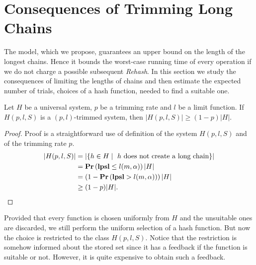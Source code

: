 \documentclass[runningheads,a4paper]{llncs}
\begin{document}
\section{Consequences of Trimming Long Chains}
The model, which we propose, guarantees an upper bound on the length of the longest chains. Hence it bounds the worst-case running time of every operation if we do not charge a possible subsequent \emph{Rehash}. In this section we study the consequences of limiting the lengths of chains and then estimate the expected number of trials, choices of a hash function, needed to find a suitable one. 

\begin{lemma}
\label{lemma-size-of-trimmed-system}
Let $H$ be a universal system, $p$ be a trimming rate and $l$ be a limit function. If $H(p, l, S)$ is a $(p, l)$-trimmed system, then $|H(p, l, S)| \geq (1 - p)|H|$.
\end{lemma}
\begin{proof}
Proof is a straightforward use of definition of the system $H(p, l, S)$ and of the trimming rate $p$.
\[
\begin{split}
|H(p, l, S)| 
	& = |\lbrace h \in H \mid \text{ $h$ does not create a long chain} \rbrace| \\
	& =\mathbf{Pr}\left(\mathbf{lpsl} \leq l(m, \alpha)\right) |H| \\
	& = \left(1 - \mathbf{Pr}\left(\mathbf{lpsl} > l(m, \alpha)\right)\right) |H| \\
	& \geq (1 - p)|H| \text{.}
\end{split}
\]
\end{proof}

Provided that every function is chosen uniformly from $H$ and the unsuitable ones are discarded, we still perform the uniform selection of a hash function. But now the choice is restricted to the class $H(p, l, S)$. Notice that the restriction is somehow informed about the stored set since it has a feedback if the function is suitable or not. However, it is quite expensive to obtain such a feedback.
\end{document}
